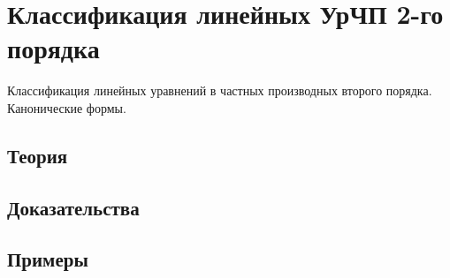 
\section{Классификация линейных УрЧП 2-го порядка}
\label{sec:2.1.01-pde-classification}

\begin{ticket}
Классификация линейных уравнений в частных производных второго порядка. Канонические формы.
\end{ticket}

\subsection*{Теория}

\subsection*{Доказательства}

\subsection*{Примеры}
